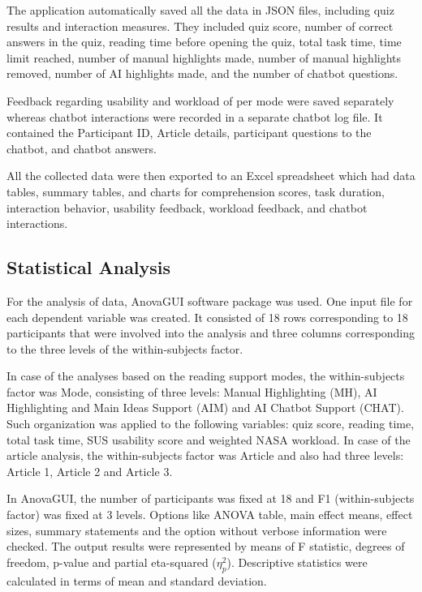 \documentclass{IEEEtran}
\begin{document}
The application automatically saved all the data in JSON files, including quiz results and interaction measures. They included quiz score, number of correct answers in the quiz, reading time before opening the quiz, total task time, time limit reached, number of manual highlights made, number of manual highlights removed, number of AI highlights made, and the number of chatbot questions.

Feedback regarding usability and workload of per mode were saved separately whereas chatbot interactions were recorded in a separate chatbot log file. It contained the Participant ID, Article details, participant questions to the chatbot, and chatbot answers.

All the collected data were then exported to an Excel spreadsheet which had data tables, summary tables, and charts for comprehension scores, task duration, interaction behavior, usability feedback, workload feedback, and chatbot interactions.

\subsection{Statistical Analysis}

For the analysis of data, AnovaGUI software package was used. One input file for each dependent variable was created. It consisted of 18 rows corresponding to 18 participants that were involved into the analysis and three columns corresponding to the three levels of the within-subjects factor.

In case of the analyses based on the reading support modes, the within-subjects factor was Mode, consisting of three levels: Manual Highlighting (MH), AI Highlighting and Main Ideas Support (AIM) and AI Chatbot Support (CHAT). Such organization was applied to the following variables: quiz score, reading time, total task time, SUS usability score and weighted NASA workload. In case of the article analysis, the within-subjects factor was Article and also had three levels: Article 1, Article 2 and Article 3.

In AnovaGUI, the number of participants was fixed at 18 and F1 (within-subjects factor) was fixed at 3 levels. Options like ANOVA table, main effect means, effect sizes, summary statements and the option without verbose information were checked. The output results were represented by means of F statistic, degrees of freedom, p-value and partial eta-squared ($\eta_p^2$). Descriptive statistics were calculated in terms of mean and standard deviation.
\end{document}
